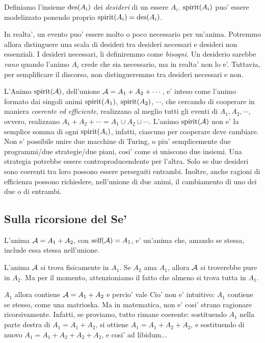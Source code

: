 Definiamo l'insieme $\textrm{des}(A_i)$ dei \emph{desideri} di un essere $A_i$. $\textrm{spirit}(A_i)$ puo' essere modelizzato ponendo proprio $\textrm{spirit}(A_i)=\textrm{des}(A_i)$. 

In realta', un evento puo' essere molto o poco necessario per un'anima. Potremmo allora distinguere una scala di desideri tra desideri necessari e desideri non essenziali. I desideri necessari, li definiremmo come \emph{bisogni}. Un desiderio sarebbe \emph{vano} quando l'animo $A_i$ crede che sia necessario, ma in realta' non lo e'. Tuttavia, per semplificare il discorso, non distingueremmo tra desideri necessari e non.

L'Animo $\textrm{spirit}(\mathcal{A})$, dell'unione $\mathcal{A}=A_1+A_2+\cdots$, e' inteso come l'animo formato dai singoli animi $\textrm{spirit}(A_1)$, $\textrm{spirit}(A_2)$, $\cdots$, che cercando di cooperare in maniera \emph{coerente ed efficiente}, realizzano al meglio tutti gli eventi di $A_1,A_2,\cdots$, ovvero, realizzano $A_1+A_2+\cdots=A_1\cup A_2\cup \cdots$. L'animo $\textrm{spirit}(\mathcal{A})$ non e' la semplice somma di ogni $\textrm{spirit}(A_i)$, infatti, ciascuno per cooperare deve cambiare. Non e' possibile unire due macchine di Turing, o piu' semplicemente due programmi/due strategie/due piani, cosi' come si uniscono due insiemi. Una strategia potrebbe essere controproducendente per l'altra. Solo se due desideri sono coerenti tra loro possono essere perseguiti entrambi. Inoltre, anche ragioni di efficienza possono richiedere, nell'unione di due animi, il cambiamento di uno dei due o di entrambi.
\\

\subsection{Sulla ricorsione del Se'}
\label{ricorsioneSe}

L'anima $\mathcal{A}=A_1+A_2$, con $\textrm{self}(\mathcal{A})=A_1$, e' un'anima che, amando se stessa, include essa stessa nell'unione. 

L'anima $\mathcal{A}$ si trova fisicamente in $A_1$. Se $A_2$ ama $A_1$, allora $\mathcal{A}$ si troverebbe pure in $A_2$. Ma per il momento, attenzioniamo il fatto che almeno si trova tutta in $A_1$.

$A_1$ allora contiene $\mathcal{A}=A_1+A_2$ e percio' vale 
Cio' non e' intuitivo: $A_1$ contiene se stesso, come una matrioska. Ma in matematica, non e' cosi' strano ragionare ricorsivamente. Infatti, se proviamo, tutto rimane coerente: sostituendo $A_1$ nella parte destra di $A_1=A_1+A_2$, si ottiene $A_1=A_1+A_2+A_2$, e sostituendo di nuovo $A_1=A_1+A_2+A_2+A_2$, e cosi' ad libidum...

